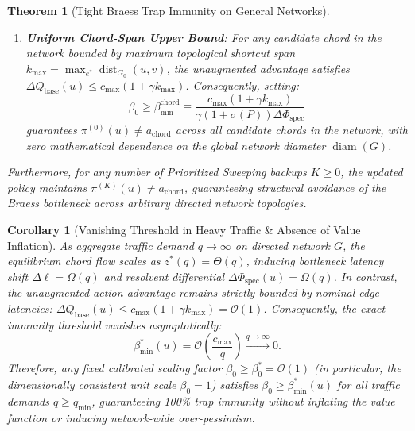 \documentclass[11pt,a4paper]{article}
\newtheorem{theorem}{Theorem}
\newtheorem{corollary}{Corollary}
\begin{document}
\begin{theorem}[Tight Braess Trap Immunity on General Networks]
\begin{enumerate}
    \item \textbf{Uniform Chord-Span Upper Bound}: For any candidate chord in the network bounded by maximum topological shortcut span $k_{\max} = \max_{e^*} \operatorname{dist}_{G_0}(u, v)$, the unaugmented advantage satisfies $\Delta Q_{\text{base}}(u) \le c_{\max} (1 + \gamma k_{\max})$. Consequently, setting:
    \begin{equation}
    \label{eq:beta_min_chord_bound}
    \beta_0 \ge \beta_{\min}^{\text{chord}} \equiv \frac{c_{\max} \left( 1 + \gamma k_{\max} \right)}{\gamma (1 + \sigma(P)) \Delta \Phi_{\text{spec}}}
    \end{equation}
    guarantees $\pi^{(0)}(u) \ne a_{\text{chord}}$ across all candidate chords in the network, with zero mathematical dependence on the global network diameter $\operatorname{diam}(G)$.
\end{enumerate}
Furthermore, for any number of Prioritized Sweeping backups $K \ge 0$, the updated policy maintains $\pi^{(K)}(u) \ne a_{\text{chord}}$, guaranteeing structural avoidance of the Braess bottleneck across arbitrary directed network topologies.
\end{theorem}

\begin{corollary}[Vanishing Threshold in Heavy Traffic \& Absence of Value Inflation]
\label{cor:vanishing_beta}
As aggregate traffic demand $q \to \infty$ on directed network $G$, the equilibrium chord flow scales as $z^*(q) = \Theta(q)$, inducing bottleneck latency shift $\Delta \ell = \Omega(q)$ and resolvent differential $\Delta \Phi_{\text{spec}}(u) = \Omega(q)$. In contrast, the unaugmented action advantage remains strictly bounded by nominal edge latencies: $\Delta Q_{\text{base}}(u) \le c_{\max}(1 + \gamma k_{\max}) = \mathcal{O}(1)$. Consequently, the exact immunity threshold vanishes asymptotically:
\begin{equation}
\label{eq:beta_vanishing}
\beta_{\min}^*(u) = \mathcal{O}\left( \frac{c_{\max}}{q} \right) \xrightarrow{q \to \infty} 0.
\end{equation}
Therefore, any fixed calibrated scaling factor $\beta_0 \ge \beta_0^* = \mathcal{O}(1)$ (in particular, the dimensionally consistent unit scale $\beta_0 = 1$) satisfies $\beta_0 \ge \beta_{\min}^*(u)$ for all traffic demands $q \ge q_{\min}$, guaranteeing 100\% trap immunity without inflating the value function or inducing network-wide over-pessimism.
\end{corollary}
\end{document}
